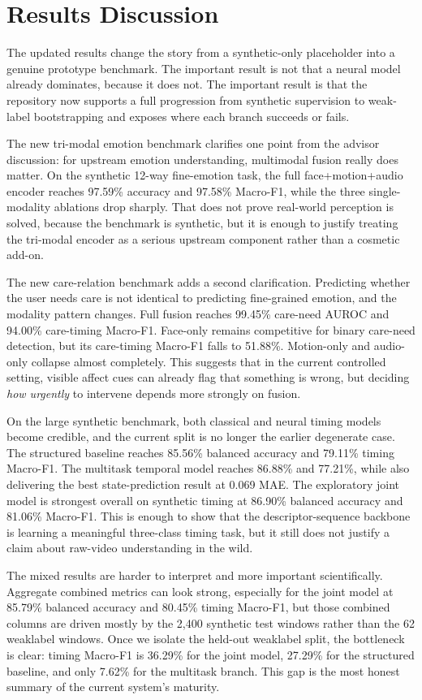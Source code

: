 \section{Results Discussion}
The updated results change the story from a synthetic-only placeholder into a genuine prototype benchmark. The important result is not that a neural model already dominates, because it does not. The important result is that the repository now supports a full progression from synthetic supervision to weak-label bootstrapping and exposes where each branch succeeds or fails.

The new tri-modal emotion benchmark clarifies one point from the advisor discussion: for upstream emotion understanding, multimodal fusion really does matter. On the synthetic 12-way fine-emotion task, the full face+motion+audio encoder reaches 97.59\% accuracy and 97.58\% Macro-F1, while the three single-modality ablations drop sharply. That does not prove real-world perception is solved, because the benchmark is synthetic, but it is enough to justify treating the tri-modal encoder as a serious upstream component rather than a cosmetic add-on.

The new care-relation benchmark adds a second clarification. Predicting whether the user needs care is not identical to predicting fine-grained emotion, and the modality pattern changes. Full fusion reaches 99.45\% care-need AUROC and 94.00\% care-timing Macro-F1. Face-only remains competitive for binary care-need detection, but its care-timing Macro-F1 falls to 51.88\%. Motion-only and audio-only collapse almost completely. This suggests that in the current controlled setting, visible affect cues can already flag that something is wrong, but deciding \emph{how urgently} to intervene depends more strongly on fusion.

On the large synthetic benchmark, both classical and neural timing models become credible, and the current split is no longer the earlier degenerate case. The structured baseline reaches 85.56\% balanced accuracy and 79.11\% timing Macro-F1. The multitask temporal model reaches 86.88\% and 77.21\%, while also delivering the best state-prediction result at 0.069 MAE. The exploratory joint model is strongest overall on synthetic timing at 86.90\% balanced accuracy and 81.06\% Macro-F1. This is enough to show that the descriptor-sequence backbone is learning a meaningful three-class timing task, but it still does not justify a claim about raw-video understanding in the wild.

The mixed results are harder to interpret and more important scientifically. Aggregate combined metrics can look strong, especially for the joint model at 85.79\% balanced accuracy and 80.45\% timing Macro-F1, but those combined columns are driven mostly by the 2{,}400 synthetic test windows rather than the 62 weaklabel windows. Once we isolate the held-out weaklabel split, the bottleneck is clear: timing Macro-F1 is 36.29\% for the joint model, 27.29\% for the structured baseline, and only 7.62\% for the multitask branch. This gap is the most honest summary of the current system's maturity.

